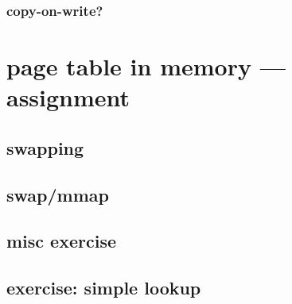 



\subsubsection{copy-on-write?} %


\section{page table in memory --- assignment}


\subsection{swapping}






\subsection{swap/mmap}


\subsection{misc exercise}


\subsection{exercise: simple lookup}

